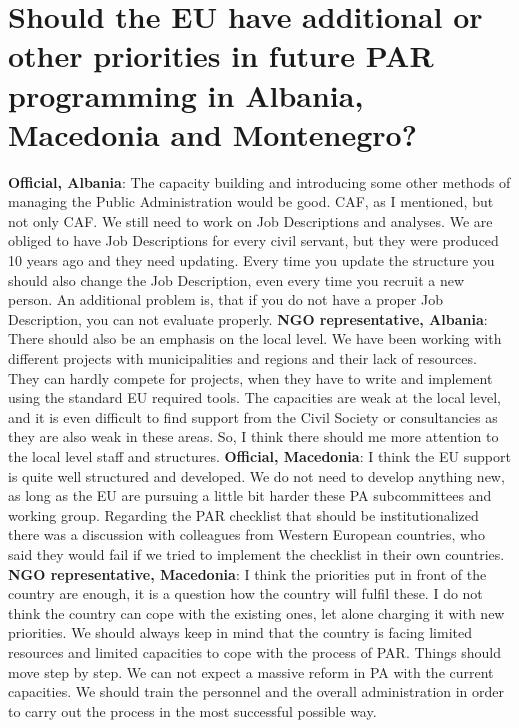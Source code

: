 \section{Should the EU have additional or other priorities in future PAR programming in Albania, Macedonia and Montenegro?}
\textbf{Official, Albania}: The capacity building and introducing some other methods of managing the Public Administration would be good. CAF, as I mentioned, but not only CAF. We still need to work on Job Descriptions and analyses. We are obliged to have Job Descriptions for every civil servant, but they were produced 10 years ago and they need updating. Every time you update the structure you should also change the Job Description, even every time you recruit a new person. An additional problem is, that if you do not have a proper Job Description, you can not evaluate properly.
\textbf{NGO representative, Albania}: There should also be an emphasis on the local level. We have been working with different projects with municipalities and regions and their lack of resources. They can hardly compete for projects, when they have to write and implement using the standard EU required tools. The capacities are weak at the local level, and it is even difficult to find support from the Civil Society or consultancies as they are also weak in these areas. So, I think there should me more attention to the local level staff and structures.
\textbf{Official, Macedonia}: I think the EU support is quite well structured and developed. We do not need to develop anything new, as long as the EU are pursuing a little bit harder these PA subcommittees and working group. Regarding the PAR checklist that should be institutionalized there was a discussion with colleagues from Western European countries, who said they would fail if we tried to implement the checklist in their own countries.
\textbf{NGO representative, Macedonia}: I think the priorities put in front of the country are enough, it is a question how the country will fulfil these. I do not think the country can cope with the existing ones, let alone charging it with new priorities. We should always keep in mind that the country is facing limited resources and limited capacities to cope with the process of PAR. Things should move step by step. We can not expect a massive reform in PA with the current capacities. We should train the personnel and the overall administration in order to carry out the process in the most successful possible way.
